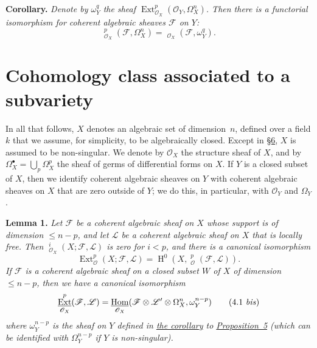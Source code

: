 \documentclass{article}
\newenvironment{itenv}[1]
  {\phantomsection\par\medskip\noindent\textbf{#1.}\itshape}
  {\par\medskip}
\newcommand{\scr}[1]{{\mathscr{#1}}}
\renewcommand{\leq}{\leqslant}
\DeclareMathOperator{\Ext}{Ext}
\DeclareMathOperator{\shExt}{\underline{Ext}}
\DeclareMathOperator{\shHom}{\underline{Hom}}
\DeclareMathOperator{\HH}{H}
\begin{document}
\begin{itenv}{Corollary}
\label{proposition5corollary}
  Denote by $\omega_Y^q$ the sheaf $\Ext_{\scr{O}_X}^p(\scr{O}_Y,\Omega_X^n)$.
  Then there is a functorial isomorphism for coherent algebraic sheaves $\scr{F}$ on $Y$:
  \[
  \label{3.8}
    \shExt_{\scr{O}_X}^p(\scr{F},\Omega_X^n) = \shHom_{\scr{O}_X}(\scr{F},\omega_Y^q).
  \tag{3.8}
  \]
\end{itenv}


\section{Cohomology class associated to a subvariety}
\label{section4}

In all that follows, $X$ denotes an algebraic set of dimension~$n$, defined over a field $k$ that we assume, for simplicity, to be algebraically closed.
Except in \hyperref[section6]{\S6}, $X$ is assumed to be non-singular.
We denote by $\scr{O}_X$ the structure sheaf of $X$, and by $\Omega_X^\bullet=\bigcup_p\Omega_X^p$ the sheaf of germs of differential forms on $X$.
If $Y$ is a closed subset of $X$, then we identify coherent algebraic sheaves on $Y$ with coherent algebraic sheaves on $X$ that are zero outside of $Y$;
we do this, in particular, with $\scr{O}_Y$ and $\Omega_Y$.

\begin{itenv}{Lemma 1}
\label{lemma1}
  Let $\scr{F}$ be a coherent algebraic sheaf on $X$ whose support is of dimension $\leq n-p$, and let $\scr{L}$ be a coherent algebraic sheaf on $X$ that is locally free.
  Then $\shExt_{\scr{O}_X}^i(X;\scr{F},\scr{L})$ is zero for $i<p$, and there is a canonical isomorphism
  \[
  \label{4.1}
    \Ext_\scr{O}^p(X;\scr{F},\scr{L}) = \HH^0(X,\shExt_\scr{O}^p(\scr{F},\scr{L})).
  \tag{4.1}
  \]
  If $\scr{F}$ is a coherent algebraic sheaf on a closed subset $W$ of $X$ of dimension $\leq n-p$, then we have a canonical isomorphism
  \[
  \label{4.1bis}
    \shExt_{\scr{O}_X}^p(\scr{F},\scr{L}) = \shHom_{\scr{O}_X}(\scr{F}\otimes\scr{L}'\otimes\Omega_X^n,\omega_Y^{n-p})
  \tag{4.1 \emph{bis}}
  \]
  where $\omega_Y^{n-p}$ is the sheaf on $Y$ defined in \hyperref[proposition5corollary]{the corollary} to \hyperref[proposition5]{Proposition~5} (which can be identified with $\Omega_Y^{n-p}$ if $Y$ is non-singular).
\end{itenv}
\end{document}
